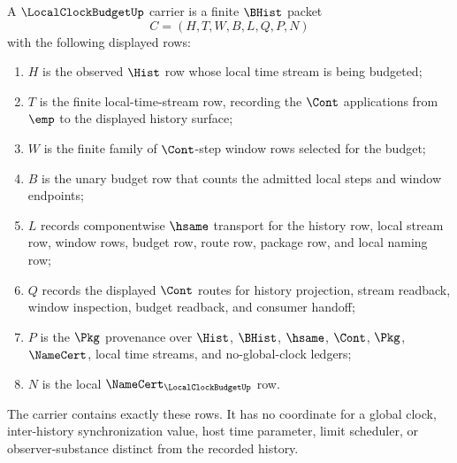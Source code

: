 \begin{definition}
\label{def:local-clock-budget-carrier}
A $\LocalClockBudgetUp$ carrier is a finite $\BHist$ packet
$$
C=(H,T,W,B,L,Q,P,N)
$$
with the following displayed rows:
\begin{enumerate}
\item $H$ is the observed $\Hist$ row whose local time stream is being budgeted;
\item $T$ is the finite local-time-stream row, recording the $\Cont$ applications from $\emp$ to the displayed history surface;
\item $W$ is the finite family of $\Cont$-step window rows selected for the budget;
\item $B$ is the unary budget row that counts the admitted local steps and window endpoints;
\item $L$ records componentwise $\hsame$ transport for the history row, local stream row, window rows, budget row, route row, package row, and local naming row;
\item $Q$ records the displayed $\Cont$ routes for history projection, stream readback, window inspection, budget readback, and consumer handoff;
\item $P$ is the $\Pkg$ provenance over $\Hist$, $\BHist$, $\hsame$, $\Cont$, $\Pkg$, $\NameCert$, local time streams, and no-global-clock ledgers;
\item $N$ is the local $\NameCert_{\LocalClockBudgetUp}$ row.
\end{enumerate}
The carrier contains exactly these rows. It has no coordinate for a global clock, inter-history synchronization value, host time parameter, limit scheduler, or observer-substance distinct from the recorded history.
\end{definition}

